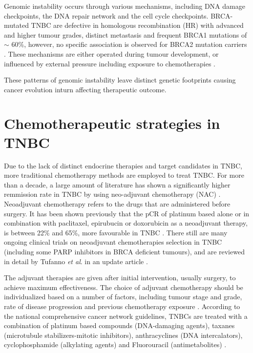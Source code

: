 Genomic instability occurs through various mechanisms, including DNA damage checkpoints, the DNA repair network and the cell cycle checkpoints. BRCA-mutated TNBC are defective in homologous recombination (HR) with advanced and higher tumour grades, distinct metastasis and frequent BRCA1 mutations of $\sim$ 60\%, however, no specific association is observed for BRCA2 mutation carriers \cite{boyle2012triple, atchley2008clinical}. These mechanisms are either operated during tumour development, or influenced by external pressure including exposure to chemotherapies \cite{burrell2013causes,ding2012clonal,hunter2006hypermutation}.

These patterns of genomic instability leave distinct genetic footprints causing cancer evolution inturn affecting therapeutic outcome. 


\section{Chemotherapeutic strategies in TNBC}
Due to the lack of distinct endocrine therapies and target candidates in TNBC, more traditional chemotherapy methods are employed to treat TNBC. For more than a decade, a large amount of literature has shown a significantly higher remmission rate in TNBC by using neo-adjuvant chemotherapy (NAC) \cite{liedtke2008response,symmans2017long}. Neoadjuvant chemotherapy refers to the drugs that are administered before surgery. It has been shown previously that the \ac{pCR} of platinum based alone or in combination with paclitaxel, epirubucin or doxorubicin as a neoadjuvant therapy, is between 22\% and 65\%,  
more favourable in TNBC \cite{silver2010efficacy,petrelli2014value,garber2006neo,frasci2009preoperative}. There still are many ongoing clinical trials on neoadjuvant chemotherapies selection in TNBC (including some PARP inhibitors in BRCA deficient tumours), and are reviewed in detail by Tufanno \textit{et al}. in an update article \cite{tufano2020updates}.

The adjuvant therapies are given after initial intervention, usually surgery, to achieve maximum effectiveness. The choice of adjuvant chemotherapy should be individualized based on a number of factors, including tumour stage and grade, rate of disease progression and previous chemotherapy exposure \cite{cardoso20173rd,partridge2014chemotherapy}. According to the national comprehensive cancer network guidelines, TNBCs are treated with a combination of platinum based compounds (DNA-damaging agents), taxanes (microtubule stabilizers-mitotic inhibitors), anthracyclines (DNA intercalators), cyclophosphamide (alkylating agents) and Fluorouracil (antimetabolites) \cite{daly2020nccn}.


